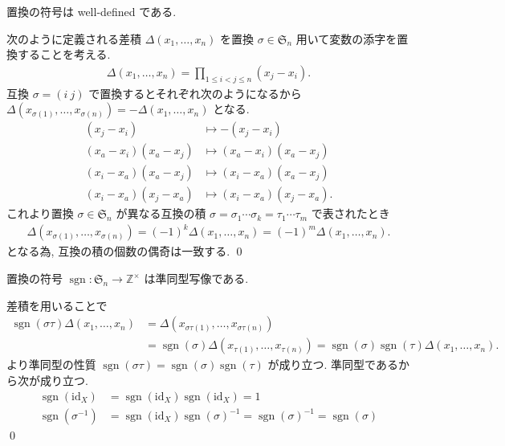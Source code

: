 \documentclass[uplatex,dvipdfmx,a4paper,11pt]{jlreq}
\makeatletter
\DeclareMathOperator{\sgn}{sgn}
\newcommand{\ZZ}{\mathbb{Z}}
\renewcommand{\SS}{\mathfrak{S}}
\newcommand{\id}{\mathrm{id}}
\numberwithin{equation}{section}
\theoremstyle{definition}
\renewenvironment{proof}[1][\proofname]{\par
  \normalfont
  \topsep6\p@\@plus6\p@ \trivlist
  \item[\hskip\labelsep{\bfseries #1}\@addpunct{\bfseries}]\ignorespaces\quad\par
}{%
  \qed\endtrivlist\@endpefalse
}
\renewcommand\proofname{証明}
\makeatother
\begin{document}
\begin{proposition}[Q21-7(ii)]
  置換の符号は well-defined である.
\end{proposition}
\begin{proof}
  次のように定義される差積 $\Delta(x_1,\ldots,x_n)$ を置換 $\sigma\in\SS_n$ 用いて変数の添字を置換することを考える.
  \begin{align}
    \Delta(x_1,\ldots,x_n) = \prod_{1\leq i<j\leq n}(x_j - x_i).
  \end{align}
  互換 $\sigma = (i\ j)$ で置換するとそれぞれ次のようになるから $\Delta(x_{\sigma(1)},\ldots,x_{\sigma(n)}) = -\Delta(x_1,\ldots,x_n)$ となる.
  \begin{align}
    (x_j - x_i)            & \mapsto -(x_j - x_i)            \\
    (x_a - x_i)(x_a - x_j) & \mapsto (x_a - x_i)(x_a - x_j)  \\
    (x_i - x_a)(x_a - x_j) & \mapsto (x_i - x_a)(x_a - x_j)  \\
    (x_i - x_a)(x_j - x_a) & \mapsto (x_i - x_a)(x_j - x_a).
  \end{align}
  これより置換 $\sigma\in\SS_n$ が異なる互換の積 $\sigma = \sigma_1\cdots\sigma_k = \tau_1\cdots\tau_m$ で表されたとき
  \begin{align}
    \Delta(x_{\sigma(1)},\ldots,x_{\sigma(n)}) = (-1)^k\Delta(x_1,\ldots,x_n) = (-1)^m\Delta(x_1,\ldots,x_n).
  \end{align}
  となる為, 互換の積の個数の偶奇は一致する.
\end{proof}

\begin{proposition}[Q21-8(i)(ii)(iii)]
  置換の符号 $\sgn: \SS_n\to\ZZ^\times$ は準同型写像である.
\end{proposition}
\begin{proof}
  差積を用いることで
  \begin{align}
    \sgn(\sigma\tau)\Delta(x_1,\ldots,x_n) & = \Delta(x_{\sigma\tau(1)},\ldots,x_{\sigma\tau(n)})                                                 \\
                                           & = \sgn(\sigma)\Delta(x_{\tau(1)},\ldots,x_{\tau(n)}) = \sgn(\sigma)\sgn(\tau)\Delta(x_1,\ldots,x_n).
  \end{align}
  より準同型の性質 $\sgn(\sigma\tau) = \sgn(\sigma)\sgn(\tau)$ が成り立つ. 準同型であるから次が成り立つ.
  \begin{align}
    \sgn(\id_X)       & = \sgn(\id_X)\sgn(\id_X) = 1                                      \\
    \sgn(\sigma^{-1}) & = \sgn(\id_X)\sgn(\sigma)^{-1} = \sgn(\sigma)^{-1} = \sgn(\sigma)
  \end{align}
\end{proof}
\end{document}
